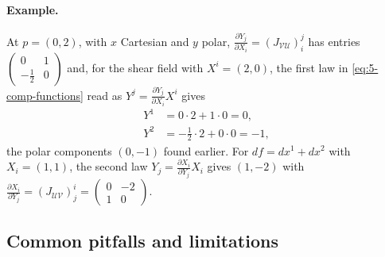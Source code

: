 \documentclass[11pt]{article}
\begin{document}
\paragraph{Example.} At $p=(0,2)$, with $x$ Cartesian and $y$ polar, $\frac{\partial Y_j}{\partial X_i}=(J_{\mathcal{VU}})^j_i$ has entries $\begin{pmatrix}0&1\\-\frac12&0\end{pmatrix}$ and, for the shear field with $X^i=(2,0)$, the first law in \eqref{eq:5-comp-functions} read as $Y^j=\frac{\partial Y_j}{\partial X_i}X^i$ gives
\begin{align*}
Y^1&=0\cdot2+1\cdot0=0,\\
Y^2&=-\tfrac12\cdot2+0\cdot0=-1,
\end{align*}
the polar components $(0,-1)$ found earlier. For $df=dx^1+dx^2$ with $X_i=(1,1)$, the second law $Y_j=\frac{\partial X_i}{\partial Y_j}X_i$ gives $(1,-2)$ with $\frac{\partial X_i}{\partial Y_j}=(J_{\mathcal{UV}})^i_j=\begin{pmatrix}0&-2\\1&0\end{pmatrix}$.

\subsection*{Common pitfalls and limitations}
\end{document}
